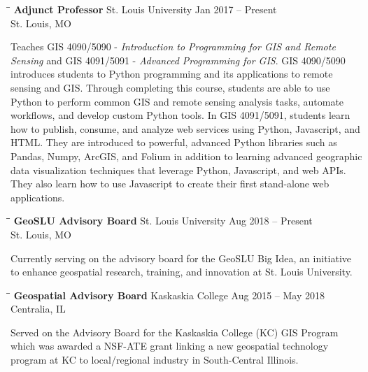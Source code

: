 \documentclass{res}
\begin{document}
\begin{resume}
   \begin{tabbing}
	\hspace{2.3in}\= \hspace{2.6in}\= \kill %
	{\bf Adjunct Professor} \>St. Louis University     \>Jan 2017 -- Present\\
	\>St. Louis, MO
\end{tabbing}\vspace{-20pt}      %
Teaches GIS 4090/5090 - \textit{Introduction to Programming for GIS and Remote Sensing} and GIS 4091/5091 - \textit{Advanced Programming for GIS}. GIS 4090/5090 introduces students to Python programming and its applications to remote sensing and GIS. Through completing this course, students are able to use Python to perform common GIS and remote sensing analysis tasks, automate workflows, and develop custom Python tools. In GIS 4091/5091, students learn how to publish, consume, and analyze web services using Python, Javascript, and HTML. They are introduced to powerful, advanced Python libraries such as Pandas, Numpy, ArcGIS, and Folium in addition to learning advanced geographic data visualization techniques that leverage Python, Javascript, and web APIs. They also learn how to use Javascript to create their first stand-alone web applications. 



   \begin{tabbing}
	\hspace{2.3in}\= \hspace{2.6in}\= \kill %
	{\bf GeoSLU Advisory Board} \>St. Louis University     \>Aug 2018 -- Present\\
	\>St. Louis, MO
\end{tabbing}\vspace{-20pt}      %
Currently serving on the advisory board for the GeoSLU Big Idea, an initiative to enhance geospatial research, training, and innovation at St. Louis University.

\begin{tabbing}
	\hspace{2.3in}\= \hspace{2.6in}\= \kill %
	{\bf Geospatial Advisory Board} \>Kaskaskia College     \>Aug 2015 -- May 2018\\
	\>Centralia, IL
\end{tabbing}\vspace{-20pt}      %
Served on the Advisory Board for the Kaskaskia College (KC) GIS Program which was awarded a NSF-ATE grant linking a new geospatial technology program at KC to local/regional industry in South-Central Illinois.
   

\end{resume}
\end{document}
